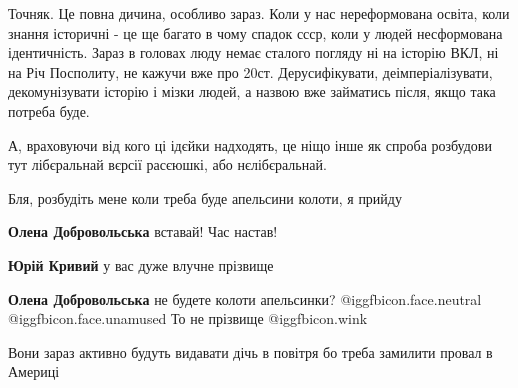\begin{itemize}
Точняк. Це повна дичина, особливо зараз. Коли у нас нереформована освіта, коли
знання історичні - це ще багато в чому спадок ссср, коли у людей несформована
ідентичність. Зараз в головах люду немає сталого погляду ні на історію ВКЛ, ні
на Річ Посполиту, не кажучи вже про 20ст. Дерусифікувати, деімперіалізувати,
декомунізувати історію і мізки людей, а назвою вже займатись після, якщо така
потреба буде.

А, враховуючи від кого ці ідєйки надходять, це ніщо інше як спроба розбудови
тут лібєральнай вєрсії расєюшкі, або нєлібєральнай.


Бля, розбудіть мене коли треба буде апельсини колоти, я прийду

\begin{itemize} %
 
\textbf{Олена Добровольська} вставай! Час настав!

 

\textbf{Юрій Кривий} у вас дуже влучне прізвище

 
\textbf{Олена Добровольська} не будете колоти апельсинки? @igg{fbicon.face.neutral}  @igg{fbicon.face.unamused} 
То не прізвище @igg{fbicon.wink} 
\end{itemize} %

 

Вони зараз активно будуть видавати дічь в повітря бо треба замилити провал в Америці


\end{itemize}
